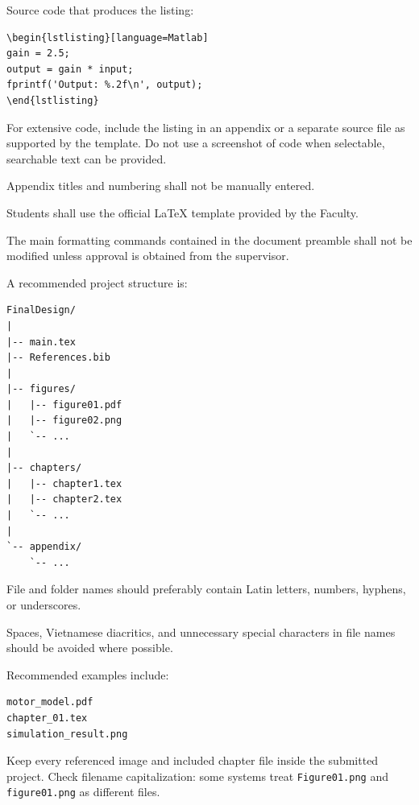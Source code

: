 {Source code that produces the listing:

\begin{verbatim}
\begin{lstlisting}[language=Matlab]
gain = 2.5;
output = gain * input;
fprintf('Output: %.2f\n', output);
\end{lstlisting}
\end{verbatim}

For extensive code, include the listing in an appendix or a separate
source file as supported by the template. Do not use a screenshot of
code when selectable, searchable text can be provided.

Appendix titles and numbering shall not be manually entered.

\vspace{0.3cm}



Students shall use the official \LaTeX{} template provided by the
Faculty.

The main formatting commands contained in the document preamble
shall not be modified unless approval is obtained from the
supervisor.

A recommended project structure is:

\begin{verbatim}
FinalDesign/
|
|-- main.tex
|-- References.bib
|
|-- figures/
|   |-- figure01.pdf
|   |-- figure02.png
|   `-- ...
|
|-- chapters/
|   |-- chapter1.tex
|   |-- chapter2.tex
|   `-- ...
|
`-- appendix/
    `-- ...
\end{verbatim}

File and folder names should preferably contain Latin letters,
numbers, hyphens, or underscores.

Spaces, Vietnamese diacritics, and unnecessary special characters
in file names should be avoided where possible.

Recommended examples include:

\begin{verbatim}
motor_model.pdf
chapter_01.tex
simulation_result.png
\end{verbatim}

Keep every referenced image and included chapter file inside the
submitted project. Check filename capitalization: some systems treat
\verb|Figure01.png| and \verb|figure01.png| as different files.

}

